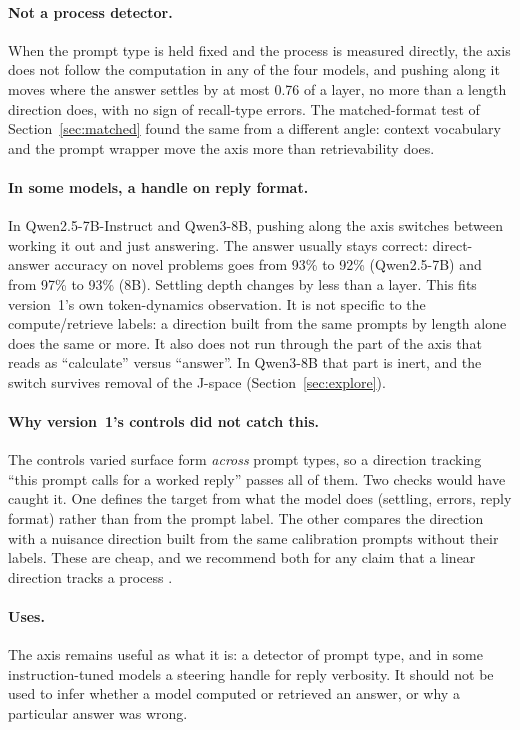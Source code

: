 \documentclass[11pt]{article}
\begin{document}
\paragraph{Not a process detector.} When the prompt type is held fixed and the process is measured directly, the axis does not follow the computation in any of the four models, and pushing along it moves where the answer settles by at most 0.76 of a layer, no more than a length direction does, with no sign of recall-type errors. The matched-format test of Section~\ref{sec:matched} found the same from a different angle: context vocabulary and the prompt wrapper move the axis more than retrievability does.

\paragraph{In some models, a handle on reply format.} In Qwen2.5-7B-Instruct and Qwen3-8B, pushing along the axis switches between working it out and just answering. The answer usually stays correct: direct-answer accuracy on novel problems goes from 93\% to 92\% (Qwen2.5-7B) and from 97\% to 93\% (8B). Settling depth changes by less than a layer. This fits version~1's own token-dynamics observation. It is not specific to the compute/retrieve labels: a direction built from the same prompts by length alone does the same or more. It also does not run through the part of the axis that reads as ``calculate'' versus ``answer''. In Qwen3-8B that part is inert, and the switch survives removal of the J-space (Section~\ref{sec:explore}).

\paragraph{Why version~1's controls did not catch this.} The controls varied surface form \emph{across} prompt types, so a direction tracking ``this prompt calls for a worked reply'' passes all of them. Two checks would have caught it. One defines the target from what the model does (settling, errors, reply format) rather than from the prompt label. The other compares the direction with a nuisance direction built from the same calibration prompts without their labels. These are cheap, and we recommend both for any claim that a linear direction tracks a process \citep{hewitt2019control,adebayo2018sanity}.

\paragraph{Uses.} The axis remains useful as what it is: a detector of prompt type, and in some instruction-tuned models a steering handle for reply verbosity. It should not be used to infer whether a model computed or retrieved an answer, or why a particular answer was wrong.
\end{document}
